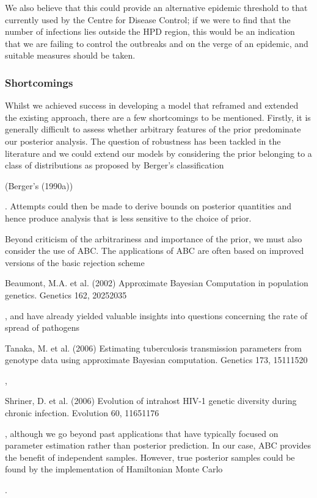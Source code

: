 \documentclass[letterpaper,10pt,english]{sphinxmanual}
\begin{document}
We also believe that this could provide an alternative epidemic threshold to that currently used by the Centre for Disease Control; if we were to find that the number of infections lies outside the HPD region, this would be an indication that we are failing to control the outbreaks and on the verge of an epidemic, and suitable measures should be taken.


\subsubsection{Shortcomings}
\label{\detokenize{models/how_big:shortcomings}}
Whilst we achieved success in developing a model that reframed and extended the existing approach, there are a few shortcomings to be mentioned. Firstly, it is generally difficult to assess whether arbitrary features of the prior  predominate our posterior analysis. The question of robustness has been tackled in the literature and we could extend our models by considering the prior belonging to a class of distributions as proposed by Berger’s classification %
\begin{footnote}[5]\sphinxAtStartFootnote
(Berger’s (1990a))
%
\end{footnote}. Attempts could then be made to derive bounds on posterior quantities and hence produce analysis that is less sensitive to the choice of prior.

Beyond criticism of the arbitrariness and importance of the prior, we must also consider the use of ABC. The applications of ABC are often based on improved versions of the basic rejection scheme %
\begin{footnote}[6]\sphinxAtStartFootnote
Beaumont, M.A. et al. (2002) Approximate Bayesian Computation in population genetics. Genetics 162, 2025\textendash{}2035
%
\end{footnote}, and have already yielded valuable insights into questions concerning the rate of spread of pathogens %
\begin{footnote}[7]\sphinxAtStartFootnote
Tanaka, M. et al. (2006) Estimating tuberculosis transmission parameters from genotype data using approximate Bayesian computation. Genetics 173, 1511\textendash{}1520
%
\end{footnote}, %
\begin{footnote}[8]\sphinxAtStartFootnote
Shriner, D. et al. (2006) Evolution of intrahost HIV-1 genetic diversity during chronic infection. Evolution 60, 1165\textendash{}1176
%
\end{footnote}, although we go beyond past applications that have typically focused on parameter estimation rather than posterior prediction. In our case, ABC provides the benefit of independent samples. However, true posterior samples could be found by the implementation of Hamiltonian Monte Carlo %
\begin{footnote}[9]\sphinxAtStartFootnote
{}
%
\end{footnote}.
\end{document}

